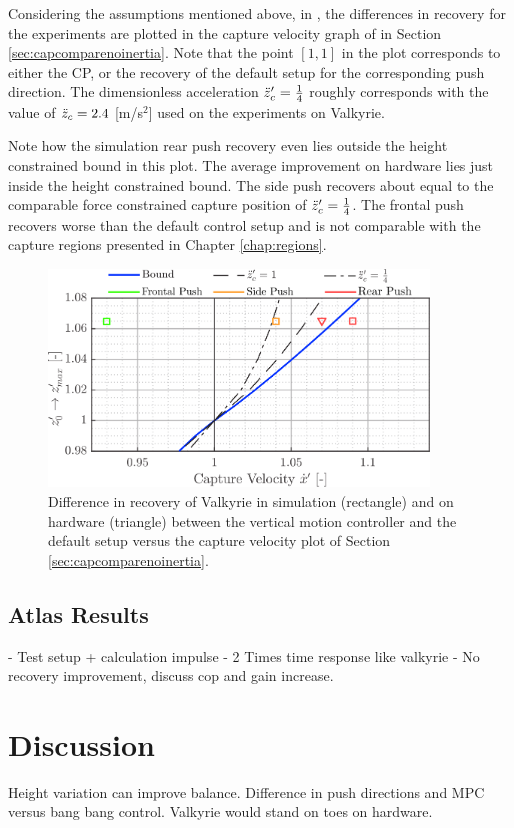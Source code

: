 Considering the assumptions mentioned above, in , the differences in recovery for the experiments are plotted in the capture velocity graph of  in Section \ref{sec:capcomparenoinertia}. Note that the point $[1,1]$ in the plot corresponds to either the \ac{CP}, or the recovery of the default setup for the corresponding push direction. The dimensionless acceleration $\ddot{z}_{c}'=\frac{1}{4}$ roughly corresponds with the value of $\ddot{z}_{c}=2.4$ [m/s$^2$] used on the experiments on Valkyrie. 

Note how the simulation rear push recovery even lies outside the height constrained bound in this plot. The average improvement on hardware lies just inside the height constrained bound. The side push recovers about equal to the comparable force constrained capture position of $\ddot{z}_{c}'=\frac{1}{4}$. The frontal push recovers worse than the default control setup and is not comparable with the capture regions presented in Chapter \ref{chap:regions}.
\begin{figure}
\centering
\includegraphics[width=0.9\textwidth]{STYLESTUFF/regioncomparison.png}
\caption{Difference in recovery of Valkyrie in simulation (rectangle) and on hardware (triangle) between the vertical motion controller and the default setup versus the capture velocity plot of Section \ref{sec:capcomparenoinertia}.}
\label{fig:regioncomparison}
\end{figure}

\subsection{Atlas Results}
- Test setup + calculation impulse
- 2 Times time response like valkyrie
- No recovery improvement, discuss cop and gain increase.
\section{Discussion}
Height variation can improve balance. Difference in push directions and \ac{MPC} versus bang bang control. Valkyrie would stand on toes on hardware.